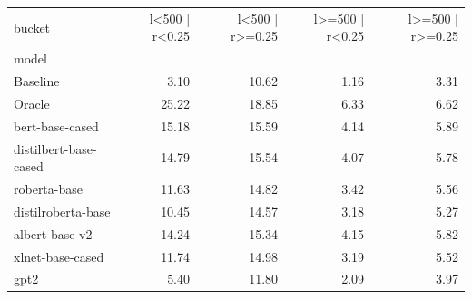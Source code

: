 \begin{tabular}{lrrrr}
\toprule
bucket & l<500 | r<0.25 & l<500 | r>=0.25 & l>=500 | r<0.25 & l>=500 | r>=0.25 \\
model &  &  &  &  \\
\midrule
Baseline & 3.10 & 10.62 & 1.16 & 3.31 \\
Oracle & 25.22 & 18.85 & 6.33 & 6.62 \\
bert-base-cased & 15.18 & 15.59 & 4.14 & 5.89 \\
distilbert-base-cased & 14.79 & 15.54 & 4.07 & 5.78 \\
roberta-base & 11.63 & 14.82 & 3.42 & 5.56 \\
distilroberta-base & 10.45 & 14.57 & 3.18 & 5.27 \\
albert-base-v2 & 14.24 & 15.34 & 4.15 & 5.82 \\
xlnet-base-cased & 11.74 & 14.98 & 3.19 & 5.52 \\
gpt2 & 5.40 & 11.80 & 2.09 & 3.97 \\
\bottomrule
\end{tabular}
